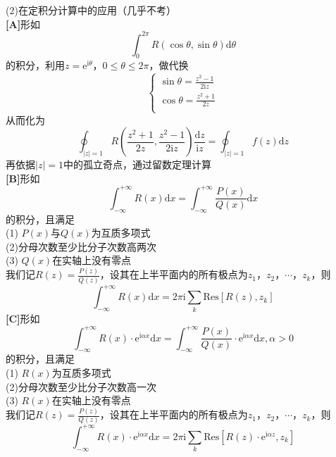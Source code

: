 \documentclass[12pt, a4paper, twoside]{ctexbook}
\begin{document}
\noindent
(2)在定积分计算中的应用（几乎不考）\\
\hspace*{2em}\textbf{[A]}形如
$$
\int_0^{2\pi}R\left(\cos \theta,\sin \theta\right)\mathrm{d}\theta
$$
\hspace*{3em}的积分，利用$z=\mathrm{e}^{\mathrm{i}\theta}$，$0\leqslant\theta\leqslant 2\pi$，做代换
$$
\left\{ \begin{array}{l}
	\sin \theta =\frac{z^2-1}{2\mathrm{i}z}\\
	\cos \theta =\frac{z^2+1}{2z}\\
\end{array} \right. 
$$
\hspace*{3em}从而化为
$$
\oint_{\left|z\right|=1}{R\left(\frac{z^2+1}{2z},\frac{z^2-1}{2\mathrm{i}z}\right)}\frac{\mathrm{d}z}{\mathrm{i}z}=\oint_{\left|z\right|=1}f\left(z\right)\mathrm{d}z
$$
\hspace*{3em}再依据$\left|z\right|=1$中的孤立奇点，通过留数定理计算\\
\hspace*{2em}\textbf{[B]}形如
$$
\int_{-\infty}^{+\infty}R\left(x\right)\mathrm{d}x=\int_{-\infty}^{+\infty}\frac{P\left(x\right)}{Q\left(x\right)}\mathrm{d}x
$$
\hspace*{3em}的积分，且满足\\
\hspace*{3em}(1) $P\left(x\right)$与$Q\left(x\right)$为互质多项式\\
\hspace*{3em}(2)分母次数至少比分子次数高两次\\
\hspace*{3em}(3) $Q\left(x\right)$在实轴上没有零点\\
\hspace*{3em}我们记$R\left(z\right)=\frac{P\left(z\right)}{Q\left(z\right)}$，设其在上半平面内的所有极点为$z_1$，$z_2$，$\cdots$，$z_k$，则
$$
\int_{-\infty}^{+\infty}R\left(x\right)\mathrm{d}x=2\pi\mathrm{i}\sum_{k}\mathrm{Res}\left[R\left(z\right),z_k\right]
$$
\hspace*{2em}\textbf{[C]}形如
$$
\int_{-\infty}^{+\infty}R\left(x\right)\cdot\mathrm{e}^{\mathrm{i}\alpha x}\mathrm{d}x=\int_{-\infty}^{+\infty}\frac{P\left(x\right)}{Q\left(x\right)}\cdot\mathrm{e}^{\mathrm{i}\alpha x}\mathrm{d}x,\alpha>0
$$
\hspace*{3em}的积分，且满足\\
\hspace*{3em}(1) $R\left(x\right)$为互质多项式\\
\hspace*{3em}(2)分母次数至少比分子次数高一次\\
\hspace*{3em}(3) $R\left(x\right)$在实轴上没有零点\\
\hspace*{3em}我们记$R\left(z\right)=\frac{P\left(z\right)}{Q\left(z\right)}$，设其在上半平面内的所有极点为$z_1$，$z_2$，$\cdots$，$z_k$，则
$$
\int_{-\infty}^{+\infty}R\left(x\right)\cdot\mathrm{e}^{\mathrm{i}\alpha x}\mathrm{d}x=2\pi\mathrm{i}\sum_{k}\mathrm{Res}\left[R\left(z\right)\cdot\mathrm{e}^{\mathrm{i}\alpha z},z_k\right]
$$
\end{document}
